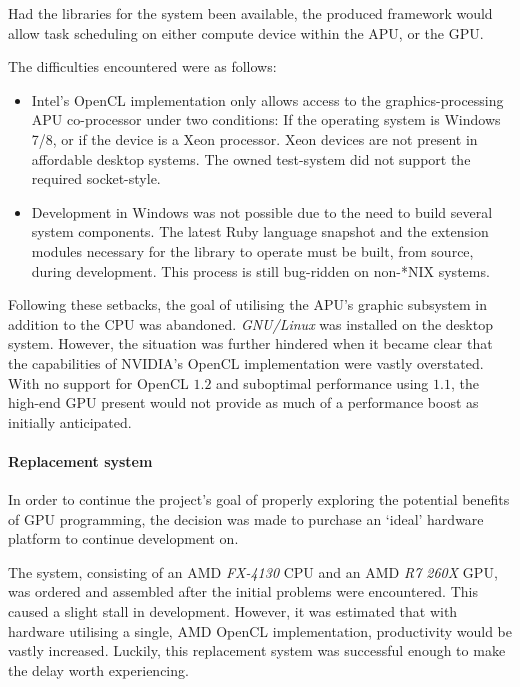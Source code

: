 Had the libraries for the system been available, the produced framework would allow task scheduling on either compute device within the \ac{APU}, or the \ac{GPU}.

The difficulties encountered were as follows:
\begin{itemize}
  \item Intel's \ac{OpenCL} implementation only allows access to the graphics-processing \ac{APU} co-processor under two conditions: If the operating system is Windows 7/8, or if the device is a Xeon processor. Xeon devices are not present in affordable desktop systems. The owned test-system did not support the required socket-style.

  \item Development in Windows was not possible due to the need to build several system components. The latest Ruby language snapshot and the extension modules necessary for the library to operate must be built, from source, during development. This process is still bug-ridden on non-*NIX systems.
\end{itemize}

Following these setbacks, the goal of utilising the \ac{APU}'s graphic subsystem in addition to the \ac{CPU} was abandoned. \emph{GNU/Linux} was installed on the desktop system. However, the situation was further hindered when it became clear that the capabilities of NVIDIA's \ac{OpenCL} implementation were vastly overstated. With no support for \ac{OpenCL} $1.2$ and suboptimal performance using $1.1$, the high-end \ac{GPU} present would not provide as much of a performance boost as initially anticipated.

\paragraph*{Replacement system}
In order to continue the project's goal of properly exploring the potential benefits of \ac{GPU} programming, the decision was made to purchase an `ideal' hardware platform to continue development on.

The system, consisting of an \ac{AMD} \emph{FX-4130} CPU and an \ac{AMD} \emph{R7 260X} \ac{GPU}, was ordered and assembled after the initial problems were encountered. This caused a slight stall in development. However, it was estimated that with hardware utilising a single, \ac{AMD} \ac{OpenCL} implementation, productivity would be vastly increased. Luckily, this replacement system was successful enough to make the delay worth experiencing.

